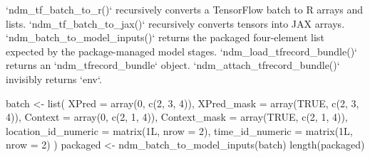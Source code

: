 \documentclass[a4paper]{book}
\begin{document}
%
\begin{Value}
`ndm\_tf\_batch\_to\_r()` recursively converts a TensorFlow batch to R
arrays and lists. `ndm\_tf\_batch\_to\_jax()` recursively converts tensors into
JAX arrays. `ndm\_batch\_to\_model\_inputs()` returns the packaged four-element
list expected by the package-managed model stages. `ndm\_load\_tfrecord\_bundle()`
returns an `ndm\_tfrecord\_bundle` object. `ndm\_attach\_tfrecord\_bundle()`
invisibly returns `env`.
\end{Value}
%
\begin{Examples}
\begin{ExampleCode}
batch <- list(
  XPred = array(0, c(2, 3, 4)),
  XPred_mask = array(TRUE, c(2, 3, 4)),
  Context = array(0, c(2, 1, 4)),
  Context_mask = array(TRUE, c(2, 1, 4)),
  location_id_numeric = matrix(1L, nrow = 2),
  time_id_numeric = matrix(1L, nrow = 2)
)
packaged <- ndm_batch_to_model_inputs(batch)
length(packaged)

\end{ExampleCode}
\end{Examples}
\printindex{}
\end{document}

